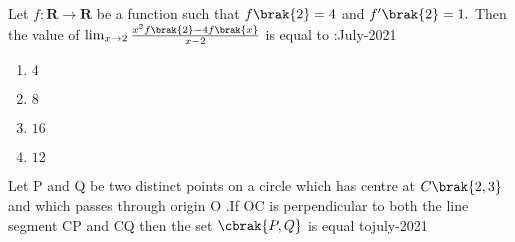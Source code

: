 \iffalse
\title{27-07-2021}
\author{AI24BTECH11032}
\section{mcq-single}
\fi

\item Let $f : \mathbf{R} \to \mathbf{R}$ be a function such that $f\brak{2}=4$ and $f'\brak{2}=1.$ Then the value of $\lim_{x \to 2} \frac{x^2 f\brak{2} - 4 f\brak{x}}{x - 2}$ is equal to :\hfill{July-2021}
\begin{multicols}{4}
    \begin{enumerate}
        \item $4$
        \item $8$
        \item $16$
        \item $12$
    \end{enumerate}
\end{multicols}
\item Let P and Q be two distinct points on a circle which has centre at $C\brak{2,3}$ and which passes through origin O .If OC is perpendicular to both the line segment CP and CQ then the set $\cbrak{P,Q}$ is equal to\hfill{july-2021}

